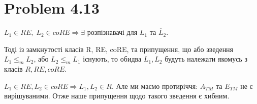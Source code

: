 \documentclass[12pt,letterpaper]{article}
\begin{document}
\section{Problem 4.13}

$L_1 \in RE, \; L_2 \in coRE \Rightarrow \exists$ розпізнавачі для $L_1$ та $\overline L_2$.

Тоді із замкнутості класів R, RE, coRE, та припущення, що або зведення $L_1 \leq_m L_2$, або $L_2 \leq_m L_1$ існують, то обидва $L_1, L_2$ будуть належати якомусь з класів $R, RE, coRE$.

$L_1 \in RE, L_2 \in coRE \Rightarrow L_1, L_2 \in R.$
Але ми маємо протиріччя: $A_{TM}$ та $E_{TM}$ не є вирішуваними. Отже наше припущення щодо такого зведення є хибним.

\end{document}
